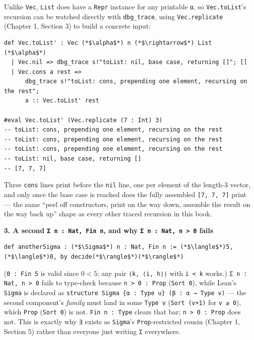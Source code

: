 Unlike \texttt{Vec}, \texttt{List} does have a \texttt{Repr} instance for any printable \texttt{α}, so \texttt{Vec.toList}'s recursion can be watched directly with \texttt{dbg\_\allowbreak{}trace}, using \texttt{Vec.replicate} (Chapter 1, Section 3) to build a concrete input:

\begin{lstlisting}
def Vec.toList' : Vec (*$\alpha$*) n (*$\rightarrow$*) List (*$\alpha$*)
  | Vec.nil => dbg_trace s!"toList: nil, base case, returning []"; []
  | Vec.cons a rest =>
      dbg_trace s!"toList: cons, prepending one element, recursing on the rest";
      a :: Vec.toList' rest

#eval Vec.toList' (Vec.replicate (7 : Int) 3)
-- toList: cons, prepending one element, recursing on the rest
-- toList: cons, prepending one element, recursing on the rest
-- toList: cons, prepending one element, recursing on the rest
-- toList: nil, base case, returning []
-- [7, 7, 7]
\end{lstlisting}

Three \texttt{cons} lines print before the \texttt{nil} line, one per element of the length-3 vector, and only once the base case is reached does the fully assembled \texttt{[7, 7, 7]} print --- the same ``peel off constructors, print on the way down, assemble the result on the way back up'' shape as every other traced recursion in this book.

\textbf{3. A second \texttt{Σ n : Nat, Fin n}, and why \texttt{Σ n : Nat, n > 0} fails}

\begin{lstlisting}
def anotherSigma : (*$\Sigma$*) n : Nat, Fin n := (*$\langle$*)5, (*$\langle$*)0, by decide(*$\rangle$*)(*$\rangle$*)
\end{lstlisting}

(\texttt{0 : Fin 5} is valid since \(0 < 5\); any pair \texttt{⟨k, ⟨i, h⟩⟩} with \texttt{i < k} works.) \texttt{Σ n : Nat, n > 0} fails to type-check because \texttt{n > 0 : Prop} (\texttt{Sort 0}), while Lean's \texttt{Sigma} is declared as \texttt{structure Sigma \{α : Type u\} (β : α → Type v)} --- the second component's \emph{family} must land in some \texttt{Type v} (\texttt{Sort (v+1)} for \texttt{v ≥ 0}), which \texttt{Prop} (\texttt{Sort 0}) is not. \texttt{Fin n : Type} clears that bar; \texttt{n > 0 : Prop} does not. This is exactly why \texttt{∃} exists as \texttt{Sigma}'s \texttt{Prop}-restricted cousin (Chapter 1, Section 5) rather than everyone just writing \texttt{Σ} everywhere.

